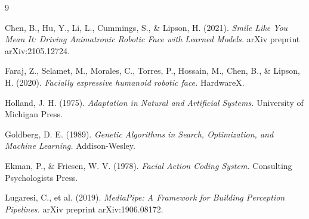 \documentclass[11pt, a4paper, twocolumn]{article}
\begin{document}
\balance

\begin{thebibliography}{9}

Chen, B., Hu, Y., Li, L., Cummings, S., \& Lipson, H. (2021).
\textit{Smile Like You Mean It: Driving Animatronic Robotic Face with Learned Models.} arXiv preprint arXiv:2105.12724.

Faraj, Z., Selamet, M., Morales, C., Torres, P., Hossain, M., Chen, B., \& Lipson, H. (2020).
\textit{Facially expressive humanoid robotic face.} HardwareX.

Holland, J. H. (1975).
\textit{Adaptation in Natural and Artificial Systems.} University of Michigan Press.

Goldberg, D. E. (1989).
\textit{Genetic Algorithms in Search, Optimization, and Machine Learning.} Addison-Wesley.

Ekman, P., \& Friesen, W. V. (1978).
\textit{Facial Action Coding System.} Consulting Psychologists Press.

Lugaresi, C., et al. (2019).
\textit{MediaPipe: A Framework for Building Perception Pipelines.} arXiv preprint arXiv:1906.08172.

\end{thebibliography}
\end{document}
